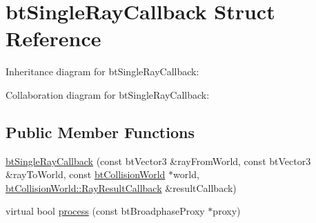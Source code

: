 \hypertarget{structbt_single_ray_callback}{\section{bt\+Single\+Ray\+Callback Struct Reference}
\label{structbt_single_ray_callback}
}


Inheritance diagram for bt\+Single\+Ray\+Callback\+:


Collaboration diagram for bt\+Single\+Ray\+Callback\+:
\subsection*{Public Member Functions}
\begin{DoxyCompactItemize}
\item 
\hyperlink{structbt_single_ray_callback_a5d29d3242de87c3f298dd3d924bd24fd}{bt\+Single\+Ray\+Callback} (const bt\+Vector3 \&ray\+From\+World, const bt\+Vector3 \&ray\+To\+World, const \hyperlink{classbt_collision_world}{bt\+Collision\+World} $\ast$world, \hyperlink{structbt_collision_world_1_1_ray_result_callback}{bt\+Collision\+World\+::\+Ray\+Result\+Callback} \&result\+Callback)
\item 
virtual bool \hyperlink{structbt_single_ray_callback_a4e0dc3a4a2d92c6a838895c9add2a5c2}{process} (const bt\+Broadphase\+Proxy $\ast$proxy)
\end{DoxyCompactItemize}
